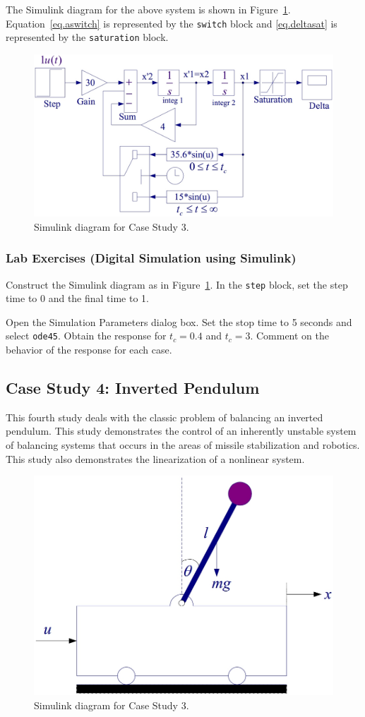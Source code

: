 The Simulink diagram for the above system is shown in Figure~\ref{fig.satsimulink}.  Equation~\eqref{eq.aswitch} is represented by the \texttt{switch} block and \eqref{eq.deltasat} is represented by the \texttt{saturation} block.

\begin{figure}[thb]
\centering
\includegraphics[width=.6\textwidth]{SatSimulink}
\caption{\footnotesize
        Simulink diagram for Case Study 3.
        \label{fig.satsimulink}
        }
\end{figure}

\subsubsection{Lab Exercises (Digital Simulation using Simulink)}
Construct the Simulink diagram as in Figure~\ref{fig.satsimulink}.  In the \texttt{step} block, set the step time to 0 and the final time to 1. \par
Open the Simulation Parameters dialog box.  Set the stop time to 5 seconds and select \texttt{ode45}.  Obtain the response for $t_c=0.4$ and $t_c = 3$.  Comment on the behavior of the response for each case.

\subsection{Case Study 4: Inverted Pendulum}
This fourth study deals with the classic problem of balancing an inverted pendulum. This study
demonstrates the control of an inherently unstable system of balancing systems that occurs in the
areas of missile stabilization and robotics. This study also demonstrates the linearization of a
nonlinear system.

\begin{figure}[thb]
\centering
\includegraphics[width=.6\textwidth]{InvPendDiagram}
\caption{\footnotesize
        Simulink diagram for Case Study 3.
        \label{fig.invpenddiagram}
        }
\end{figure}

